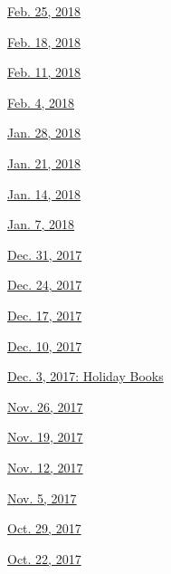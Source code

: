 \href{https://www.nytimes.com/issue/todayspaper/2018/02/25/todays-new-york-times\#bookreview}{Feb.
25, 2018}

\href{https://www.nytimes.com/issue/todayspaper/2018/02/18/todays-new-york-times\#bookreview}{Feb.
18, 2018}

\href{https://www.nytimes.com/issue/todayspaper/2018/02/11/todays-new-york-times\#bookreview}{Feb.
11, 2018}

\href{https://www.nytimes.com/issue/todayspaper/2018/02/04/todays-new-york-times\#bookreview}{Feb.
4, 2018}

\href{http://www.nytimes.com/indexes/2018/01/28/todayspaper/index.html\#bookreview}{Jan.
28, 2018}

\href{http://www.nytimes.com/indexes/2018/01/21/todayspaper/index.html\#bookreview}{Jan.
21, 2018}

\href{http://www.nytimes.com/indexes/2018/01/14/todayspaper/index.html\#bookreview}{Jan.
14, 2018}

\href{http://www.nytimes.com/indexes/2018/01/07/todayspaper/index.html\#bookreview}{Jan.
7, 2018}

\href{http://www.nytimes.com/indexes/2017/12/31/todayspaper/index.html\#bookreview}{Dec.
31, 2017}

\href{http://www.nytimes.com/indexes/2017/12/24/todayspaper/index.html\#bookreview}{Dec.
24, 2017}

\href{http://www.nytimes.com/indexes/2017/12/17/todayspaper/index.html\#bookreview}{Dec.
17, 2017}

\href{http://www.nytimes.com/indexes/2017/12/10/todayspaper/index.html\#bookreview}{Dec.
10, 2017}

\href{http://www.nytimes.com/indexes/2017/12/03/todayspaper/index.html\#bookreview}{Dec.
3, 2017: Holiday Books}

\href{http://www.nytimes.com/indexes/2017/11/26/todayspaper/index.html\#bookreview}{Nov.
26, 2017}

\href{http://www.nytimes.com/indexes/2017/11/19/todayspaper/index.html\#bookreview}{Nov.
19, 2017}

\href{http://www.nytimes.com/indexes/2017/11/12/todayspaper/index.html\#bookreview}{Nov.
12, 2017}

\href{http://www.nytimes.com/indexes/2017/11/05/todayspaper/index.html\#bookreview}{Nov.
5, 2017}

\href{http://www.nytimes.com/indexes/2017/10/29/todayspaper/index.html\#bookreview}{Oct.
29, 2017}

\href{http://www.nytimes.com/indexes/2017/10/22/todayspaper/index.html\#bookreview}{Oct.
22, 2017}

